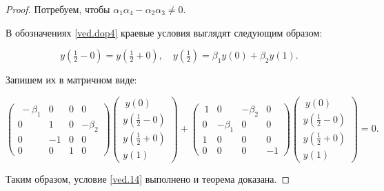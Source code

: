 \begin{proof}
Потребуем, чтобы $\alpha_1\alpha_4-\alpha_2\alpha_3\neq 0$.

В обозначениях \eqref{ved.dop4} краевые условия выглядят следующим образом:

$$y(\tfrac12-0)=y(\tfrac12+0), \quad y(\tfrac12)=\beta_1y(0)+\beta_2y(1).$$

Запишем их в матричном виде:

$$

\begin{pmatrix}

\ -\beta_1 & 0 & 0 & 0 \\

0  & 1 & 0 & -\beta_2\\

0& -1 & 0 & 0\\

0 & 0 & 1 & 0

\end{pmatrix}\begin{pmatrix}

\ y(0)\\[1mm]

y(\frac12-0)\\[1mm]

y(\frac12+0)\\[1mm]

y(1)

\end{pmatrix}+\begin{pmatrix}

\ 1 & 0 & -\beta_2 & 0 \\

0  & -\beta_1 & 0 & 0\\

1 & 0 & 0 & 0\\

0 & 0 & 0 & -1

\end{pmatrix}\begin{pmatrix}

\ y(0)\\[1mm]

y(\frac12-0)\\[1mm]

y(\frac12+0)\\[1mm]

y(1)

\end{pmatrix}=0.

$$

   

Таким образом, условие \eqref{ved.14} выполнено и теорема доказана.  

  \end{proof}



